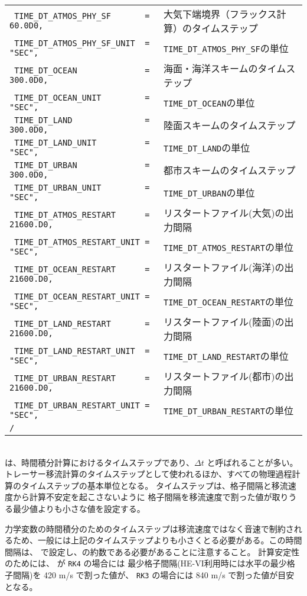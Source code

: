 {{{\begin{tabularx}{140mm}{lX}
\verb| TIME_DT_ATMOS_PHY_SF       = 60.0D0, | & 大気下端境界（フラックス計算）のタイムステップ\\
\verb| TIME_DT_ATMOS_PHY_SF_UNIT  = "SEC",  | & \verb|TIME_DT_ATMOS_PHY_SF|の単位\\
\verb| TIME_DT_OCEAN              = 300.0D0,| & 海面・海洋スキームのタイムステップ\\
\verb| TIME_DT_OCEAN_UNIT         = "SEC",  | & \verb|TIME_DT_OCEAN|の単位\\
\verb| TIME_DT_LAND               = 300.0D0,| & 陸面スキームのタイムステップ\\
\verb| TIME_DT_LAND_UNIT          = "SEC",  | & \verb|TIME_DT_LAND|の単位\\
\verb| TIME_DT_URBAN              = 300.0D0,| & 都市スキームのタイムステップ\\
\verb| TIME_DT_URBAN_UNIT         = "SEC",  | & \verb|TIME_DT_URBAN|の単位\\
\verb| TIME_DT_ATMOS_RESTART      = 21600.D0, | & リスタートファイル(大気)の出力間隔\\
\verb| TIME_DT_ATMOS_RESTART_UNIT = "SEC",    | & \verb|TIME_DT_ATMOS_RESTART|の単位\\
\verb| TIME_DT_OCEAN_RESTART      = 21600.D0, | & リスタートファイル(海洋)の出力間隔\\
\verb| TIME_DT_OCEAN_RESTART_UNIT = "SEC",    | & \verb|TIME_DT_OCEAN_RESTART|の単位\\
\verb| TIME_DT_LAND_RESTART       = 21600.D0, | & リスタートファイル(陸面)の出力間隔\\
\verb| TIME_DT_LAND_RESTART_UNIT  = "SEC",    | & \verb|TIME_DT_LAND_RESTART|の単位\\
\verb| TIME_DT_URBAN_RESTART      = 21600.D0, | & リスタートファイル(都市)の出力間隔\\
\verb| TIME_DT_URBAN_RESTART_UNIT = "SEC",    | & \verb|TIME_DT_URBAN_RESTART|の単位\\
\verb|/|\\
\end{tabularx}
}}}\\


 は、時間積分計算におけるタイムステップであり、$\Delta t$ と呼ばれることが多い。
トレーサー移流計算のタイムステップとして使われるほか、すべての物理過程計算のタイムステップの基本単位となる。
タイムステップは、格子間隔と移流速度から計算不安定を起こさないように
格子間隔を移流速度で割った値が取りうる最少値よりも小さな値を設定する。

力学変数の時間積分のためのタイムステップは移流速度ではなく音速で制約されるため、一般には上記のタイムステップよりも小さくとる必要がある。この時間間隔は、 で設定し、の約数である必要があることに注意すること。
計算安定性のためには、 が \verb|RK4| の場合には
最少格子間隔(HE-VI利用時には水平の最少格子間隔)を 420 m/s で割った値が、
\verb|RK3| の場合には 840 m/s で割った値が目安となる。


